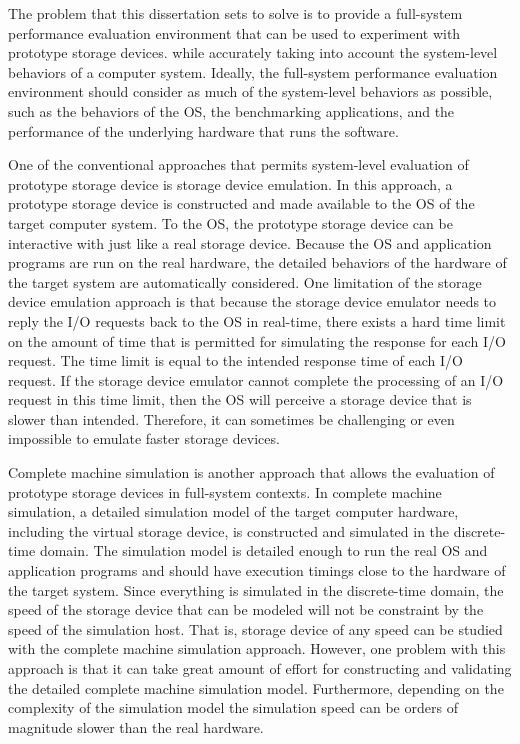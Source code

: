 The problem that this dissertation sets to solve is to provide a full-system performance evaluation environment that can be used to experiment with prototype storage devices. while accurately taking into account the system-level behaviors of a computer system. Ideally, the full-system performance evaluation environment should consider as much of the system-level behaviors as possible, such as the behaviors of the OS, the benchmarking applications, and the performance of the underlying hardware that runs the software.

One of the conventional approaches that permits system-level evaluation of prototype storage device is storage device emulation. In this approach, a prototype storage device is constructed and made available to the OS of the target computer system. To the OS, the prototype storage device can be interactive with just like a real storage device. Because the OS and application programs are run on the real hardware, the detailed behaviors of the hardware of the target system are automatically considered. One limitation of the storage device emulation approach is that because the storage device emulator needs to reply the I/O requests back to the OS in real-time, there exists a hard time limit on the amount of time that is permitted for simulating the response for each I/O request. The time limit is equal to the intended response time of each I/O request. If the storage device emulator cannot complete the processing of an I/O request in this time limit, then the OS will perceive a storage device that is slower than intended. Therefore, it can sometimes be challenging or even impossible to emulate faster storage devices.

Complete machine simulation is another approach that allows the evaluation of prototype storage devices in full-system contexts. In complete machine simulation, a detailed simulation model of the target computer hardware, including the virtual storage device, is constructed and simulated in the discrete-time domain. The simulation model is detailed enough to run the real OS and application programs and should have execution timings close to the hardware of the target system. Since everything is simulated in the discrete-time domain, the speed of the storage device that can be modeled will not be constraint by the speed of the simulation host. That is, storage device of any speed can be studied with the complete machine simulation approach. However, one problem with this approach is that it can take great amount of effort for constructing and validating the detailed complete machine simulation model. Furthermore, depending on the complexity of the simulation model the simulation speed can be orders of magnitude slower than the real hardware. 


